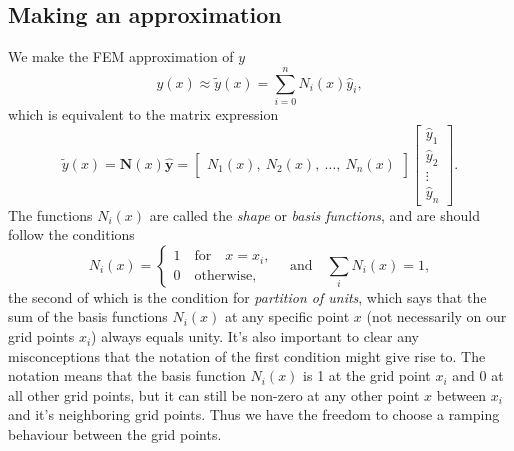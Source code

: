 \documentclass[acmtog]{acmart}
\begin{document}
\subsection{Making an approximation}
We make the FEM approximation of $ y$
%
\begin{equation}
  y(x) \approx \tilde y(x) = \sum_{i=0}^n N_i(x) \hat{y}_i,
\end{equation}
%
which is equivalent to the matrix expression
%
\begin{equation}
  \tilde{y}(x) = \boldsymbol N(x) \boldsymbol{ \hat{y}} =\begin{bmatrix}
    N_1(x), \ N_2(x), \ \dots, \ N_n(x)
  \end{bmatrix} \begin{bmatrix}
    \hat{y}_1 \\
    \hat{y}_2 \\
    \vdots    \\
    \hat{y}_n
  \end{bmatrix}.
\end{equation}
%
The functions $N_i(x)$ are called the \textit{shape} or \textit{basis
  functions}, and are should follow the conditions
%
\begin{equation}
  N_i(x) = \begin{cases}
    1 \quad \text{for} \quad x= x_i, \\
    0 \quad \text{otherwise},
  \end{cases} \quad \mathrm{and} \quad \sum_i N_i(x) = 1,
\end{equation}
%
the second of which is the condition for \textit{partition of units}, which says that the sum of the basis functions $N_i(x)$ at any specific point $x$ (not necessarily on our grid points $x_i$) always equals unity. It's also important to clear any misconceptions that the notation of the first condition might give rise to. The notation means that the basis function $N_i(x)$ is 1 at the grid point $x_i$ and 0 at all other grid points, but it can still be non-zero at any other point $x$ between $x_i$ and it's neighboring grid points. Thus we have the freedom to choose a ramping behaviour between the grid points.
\end{document}
